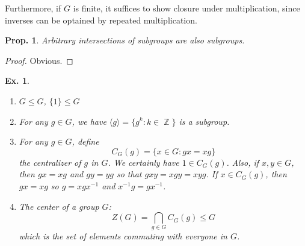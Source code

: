 \documentclass[12pt, a4paper]{book}
\DeclareMathOperator{\Z}{\mathbb{Z}}
\newtheorem{proposition}[theorem]{Prop.}
\newtheorem{example}[theorem]{Ex.}
\theoremstyle{nonumberplain}
\newtheorem{proof}{Proof}
\begin{document}
Furthermore, if $G$ is finite, it suffices to show closure under multiplication, since inverses can be optained by repeated multiplication.
\begin{proposition}
    Arbitrary intersections of subgroups are also subgroups.
\end{proposition}
\begin{proof}
    Obvious.
\end{proof}
\begin{example}
    \begin{enumerate}
        \item $G\leq G$, $\{1\}\leq G$
        \item For any $g\in G$, we have $\langle g\rangle=\{g^k:k\in\Z\}$ is a subgroup.
        \item For any $g\in G$, define
            \[C_G(g)=\{x\in G:gx=xg\}\]
            the centralizer of $g$ in $G$.
            We certainly have $1\in C_G(g)$.
            Also, if $x,y\in G$, then $gx=xg$ and $gy=yg$ so that $gxy=xgy=xyg$.
            If $x\in C_G(g)$, then $gx=xg$ so $g=xgx^{-1}$ and $x^{-1}g=gx^{-1}$.
        \item The center of a group $G$:
            \[Z(G)=\bigcap_{g\in G}C_G(g)\leq G\]
            which is the set of elements commuting with everyone in $G$.
    \end{enumerate}
\end{example}
\end{document}

